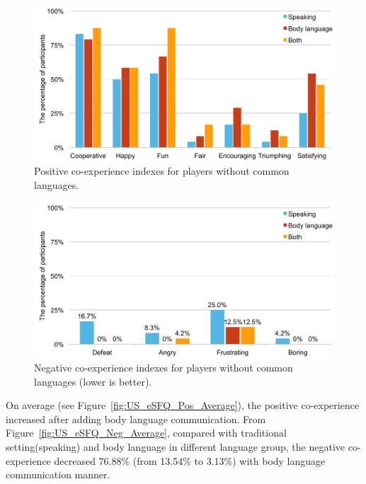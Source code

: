 

\begin{figure}[!h]
\centering
\includegraphics[width=0.9\columnwidth]{Figures/US_Co-ex_Dif_Pos.pdf}
\caption{Positive co-experience indexes for players without common languages.}
\label{fig:US_Co-ex_Dif_Pos}
\end{figure}

\begin{figure}[!h]
\centering
\includegraphics[width=0.9\columnwidth]{Figures/US_Co-ex_Dif_Neg.pdf}
\caption{Negative co-experience indexes for players without common languages (lower is better).}
\label{fig:US_Co-ex_Dif_Neg}
\end{figure}

On average (see Figure~\ref{fig:US_eSFQ_Pos_Average}), the positive co-experience increased after adding body language communication. From Figure~\ref{fig:US_eSFQ_Neg_Average}, compared with traditional setting(speaking) and body language in different language group, the negative co-experience decreased 76.88\% (from 13.54\% to 3.13\%) with body language communication manner.

